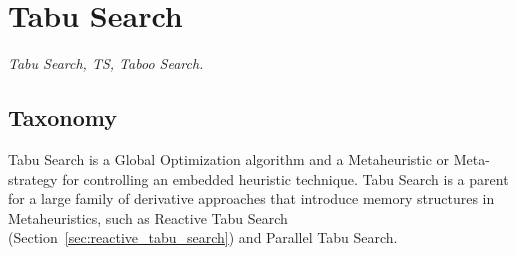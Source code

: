 

\section{Tabu Search} 
\label{sec:tabu_search}

\emph{Tabu Search, TS, Taboo Search.}

\subsection{Taxonomy}
Tabu Search is a Global Optimization algorithm and a Metaheuristic or Meta-strategy for controlling an embedded heuristic technique. 
Tabu Search is a parent for a large family of derivative approaches that introduce memory structures in Metaheuristics, such as Reactive Tabu Search (Section~\ref{sec:reactive_tabu_search}) and Parallel Tabu Search.


